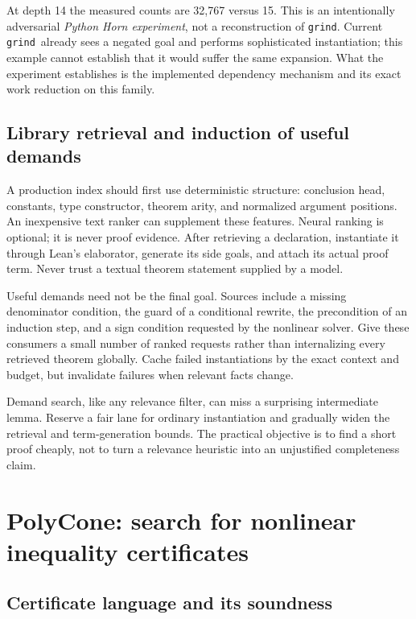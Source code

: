\documentclass[11pt,a4paper]{article}
\newcommand{\grind}{\texttt{grind}}
\begin{document}
At depth 14 the measured counts are 32,767 versus 15. This is an intentionally
adversarial \emph{Python Horn experiment}, not a reconstruction of \grind.
Current \grind\ already sees a negated goal and performs sophisticated
instantiation; this example cannot establish that it would suffer the same
expansion. What the experiment establishes is the implemented dependency
mechanism and its exact work reduction on this family.

\subsection{Library retrieval and induction of useful demands}

A production index should first use deterministic structure: conclusion head,
constants, type constructor, theorem arity, and normalized argument positions.
An inexpensive text ranker can supplement these features. Neural ranking is
optional; it is never proof evidence. After retrieving a declaration, instantiate
it through Lean's elaborator, generate its side goals, and attach its actual
proof term. Never trust a textual theorem statement supplied by a model.

Useful demands need not be the final goal. Sources include a missing denominator
condition, the guard of a conditional rewrite, the precondition of an induction
step, and a sign condition requested by the nonlinear solver. Give these
consumers a small number of ranked requests rather than internalizing every
retrieved theorem globally. Cache failed instantiations by the exact context
and budget, but invalidate failures when relevant facts change.

Demand search, like any relevance filter, can miss a surprising intermediate
lemma. Reserve a fair lane for ordinary instantiation and gradually widen the
retrieval and term-generation bounds. The practical objective is to find a
short proof cheaply, not to turn a relevance heuristic into an unjustified
completeness claim.


\section{PolyCone: search for nonlinear inequality certificates}

\subsection{Certificate language and its soundness}
\end{document}
